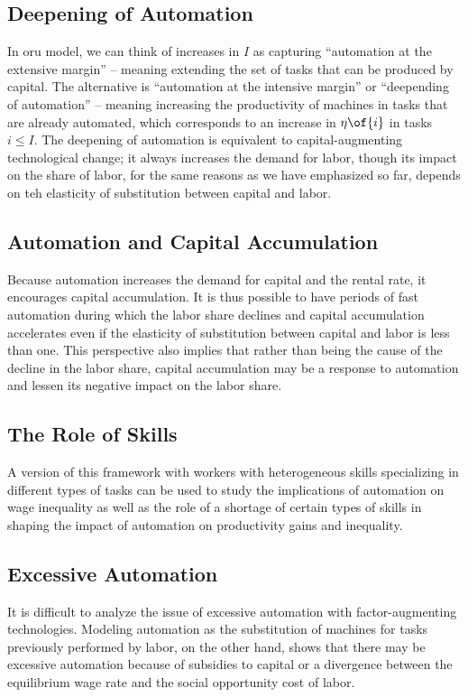 \documentclass[12pt]{article}
\newcommand{\CiteReference}{../reference.bib}
\theoremstyle{definition}
\begin{document}
\subsection{Deepening of Automation}

In oru model, we can think of increases in $I$ as capturing ``automation at the extensive margin'' -- meaning extending the set of tasks that can be produced by capital. The alternative is ``automation at the intensive margin'' or  ``deepending of automation'' -- meaning increasing the productivity of machines in tasks that are already automated, which corresponds to an increase in $\eta\of{i}$ in tasks $i \leq I$. The deepening of automation is equivalent to capital-augmenting technological change; it always increases the demand for labor, though its impact on the share of labor, for the same reasons as we have emphasized so far, depends on teh elasticity of substitution between capital and labor. 

\subsection{Automation and Capital Accumulation}

Because automation increases the demand for capital and the rental rate, it encourages capital accumulation. It is thus possible to have periods of fast automation during which the labor share declines and capital accumulation accelerates even if the elasticity of substitution between capital and labor is less than one. This perspective also implies that rather than being the cause of the decline in the labor share, capital accumulation may be a response to automation and lessen its negative impact on the labor share.

\subsection{The Role of Skills}

A version of this framework with workers with heterogeneous skills specializing in different types of tasks can be used to study the implications of automation on wage inequality as well as the role of a shortage of certain types of skills in shaping the impact of automation on productivity gains and inequality.

\subsection{Excessive Automation}

It is difficult to analyze the issue of excessive automation with factor-augmenting technologies. Modeling automation as the substitution of machines for tasks previously performed by labor, on the other hand, shows that there may be excessive automation because of subsidies to capital or a divergence between the equilibrium wage rate and the social opportunity cost of labor.



\end{document}
